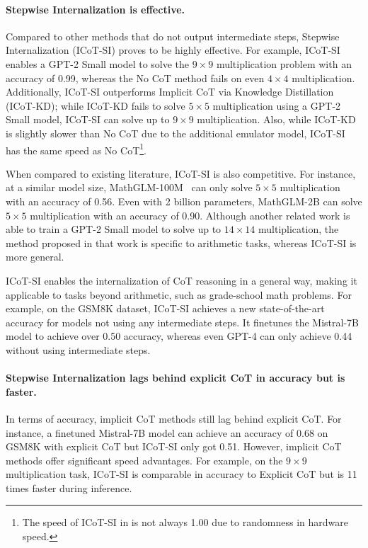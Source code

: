 \documentclass{article}
\newcommand{\icotsi}{{ICoT-SI}}
\newcommand{\icotkd}{{ICoT-KD}}
\begin{document}
\paragraph{Stepwise Internalization is effective.}
Compared to other methods that do not output intermediate steps, Stepwise Internalization (\icotsi) proves to be highly effective. For example, \icotsi{} enables a GPT-2 Small model to solve the $9\times9$ multiplication problem with an accuracy of 0.99, whereas the No CoT method fails on even $4\times4$ multiplication. Additionally, \icotsi{} outperforms Implicit CoT via Knowledge Distillation (\icotkd); while \icotkd{} fails to solve $5\times5$ multiplication using a GPT-2 Small model, \icotsi{} can solve up to $9\times9$ multiplication. Also, while \icotkd{} is slightly slower than No CoT due to the additional emulator model, \icotsi{} has the same speed as No CoT\footnote{The speed of \icotsi{} in  is not always 1.00 due to randomness in hardware speed.}.

When compared to existing literature, \icotsi{} is also competitive. For instance, at a similar model size, MathGLM-100M~\citep{yang2023gpt} can only solve $5\times5$ multiplication with an accuracy of 0.56. Even with 2 billion parameters, MathGLM-2B can solve $5\times5$ multiplication with an accuracy of 0.90. Although another related work \citep{shen2023positional} is able to train a GPT-2 Small model to solve up to $14\times14$ multiplication, the method proposed in that work is specific to arithmetic tasks, whereas \icotsi{} is more general.

\icotsi{} enables the internalization of CoT reasoning in a general way, making it applicable to tasks beyond arithmetic, such as grade-school math problems. For example, on the GSM8K dataset, \icotsi{} achieves a new state-of-the-art accuracy for models not using any intermediate steps. It finetunes the Mistral-7B model to achieve over 0.50 accuracy, whereas even GPT-4 can only achieve 0.44 without using intermediate steps.

\paragraph{Stepwise Internalization lags behind explicit CoT in accuracy but is faster.}
In terms of accuracy, implicit CoT methods still lag behind explicit CoT. For instance, a finetuned Mistral-7B model can achieve an accuracy of 0.68 on GSM8K with explicit CoT but \icotsi{} only got 0.51. However, implicit CoT methods offer significant speed advantages. For example, on the $9\times9$ multiplication task, \icotsi{} is comparable in accuracy to Explicit CoT but is 11 times faster during inference.
\end{document}
